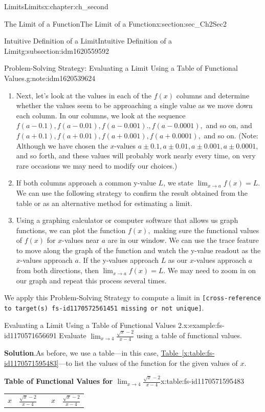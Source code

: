 \documentclass[oneside,10pt,]{book}
\newcommand{\blocktitlefont}{\relax}
\newcommand{\tabularfont}{\relax}
\newcommand{\xreffont}{\relax}
\newcommand{\mono}[1]{\texttt{#1}}
\numberwithin{equation}{section}
\begin{document}
\begin{chapterptx}{Limits}{}{Limits}{}{}{x:chapter:ch_second}
\begin{sectionptx}{The Limit of a Function}{}{The Limit of a Function}{}{}{x:section:sec_Ch2Sec2}
\begin{subsectionptx}{Intuitive Definition of a Limit}{}{Intuitive Definition of a Limit}{}{}{g:subsection:idm1620559592}
\begin{note}{Problem-Solving Strategy: Evaluating a Limit Using a Table of Functional Values.}{g:note:idm1620539624}
\begin{enumerate}
\item{}Next, let’s look at the values in each of the \(f(x)\) columns and determine whether the values seem to be approaching a single value as we move down each column. In our columns, we look at the sequence \(f(a-0.1),f(a-0.01),f(a-0.001).,f(a-0.0001),\) and so on, and \(f(a+0.1),f(a+0.01),f(a+0.001),f(a+0.0001),\) and so on. (Note: Although we have chosen the \(x\)-values \(a\pm 0.1,a\pm 0.01,a\pm 0.001,a\pm 0.0001,\) and so forth, and these values will probably work nearly every time, on very rare occasions we may need to modify our choices.)%
\item{}If both columns approach a common y-value \(L \), we state \(\lim_{x \to a} f(x)=L.\) We can use the following strategy to confirm the result obtained from the table or as an alternative method for estimating a limit.%
\item{}Using a graphing calculator or computer software that allows us graph functions, we can plot the function \(f(x),\) making sure the functional values of \(f(x)\) for \(x\)-values near \(a \) are in our window. We can use the trace feature to move along the graph of the function and watch the y-value readout as the \(x\)-values approach \(a \). If the y-values approach \(L \) as our \(x\)-values approach \(a \) from both directions, then \(\lim_{x \to a} f(x)=L.\) We may need to zoom in on our graph and repeat this process several times.%
\end{enumerate}
\end{note}
We apply this Problem-Solving Strategy to compute a limit in \mono{[cross-reference to target(s) \textquotedbl{}fs-id1170572561451\textquotedbl{} missing or not unique]}.%
\begin{example}{Evaluating a Limit Using a Table of Functional Values 2.}{x:example:fs-id1170571656691}%
Evaluate \(\lim_{x\to4}\frac{\sqrt{x}-2}{x-4}\) using a table of functional values.%
\par\smallskip%
\noindent\textbf{\blocktitlefont Solution}.\hypertarget{g:solution:idm1620504936}{}\quad{}As before, we use a table—in this case, \hyperref[x:table:fs-id1170571595483]{Table~{\xreffont\ref{x:table:fs-id1170571595483}}}—to list the values of the function for the given values of \(x\).%
\begin{tableptx}{\textbf{Table of Functional Values for \(\lim_{x\to4}\frac{\sqrt{x}-2}{x-4}\)}}{x:table:fs-id1170571595483}{}%
\centering%
{\tabularfont%
\begin{tabular}{lllll}
\textbf{\(x\)}&\textbf{\(\frac{\sqrt{x}-2}{x-4}\)}&\textbf{}&\textbf{\(x\)}&\textbf{\(\frac{\sqrt{x}-2}{x-4}\)}\tabularnewline[0pt]

\end{tabular}}
\end{tableptx}
\end{example}
\end{subsectionptx}
\end{sectionptx}
\end{chapterptx}
\end{document}
